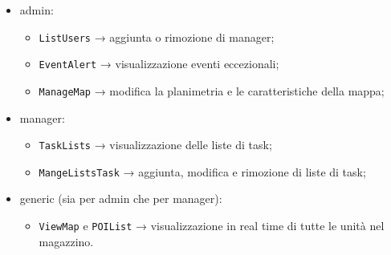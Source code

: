 \begin{itemize}
	\item admin:
	\begin{itemize}
		\item \texttt{ListUsers} → aggiunta o rimozione di manager;
		\item \texttt{EventAlert} → visualizzazione eventi eccezionali;
		\item \texttt{ManageMap} → modifica la planimetria e le caratteristiche della mappa;
	\end{itemize}
	\item manager:
	\begin{itemize}
		\item \texttt{TaskLists} → visualizzazione delle liste di task;
		\item \texttt{MangeListsTask} → aggiunta, modifica e rimozione di liste di task;
	\end{itemize}
	\item generic (sia per admin che per manager):
	\begin{itemize}
		\item \texttt{ViewMap} e \texttt{POIList} → visualizzazione in real time di tutte le unità nel magazzino.
	\end{itemize}
\end{itemize}



